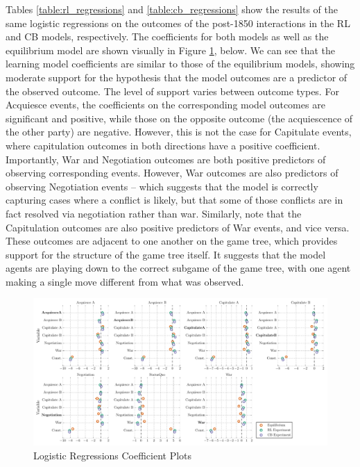 

Tables \ref{table:rl_regressions} and \ref{table:cb_regressions} show the results of the same logistic regressions on the outcomes of the post-1850 interactions in the RL and CB models, respectively. The coefficients for both models as well as the equilibrium model are shown visually in Figure \ref{fig:coef_plots}, below. We can see that the learning model coefficients are similar to those of the equilibrium models, showing moderate support for the hypothesis that the model outcomes are a predictor of the observed outcome. The level of support varies between outcome types. For Acquiesce events, the coefficients on the corresponding model outcomes are significant and positive, while those on the opposite outcome (the acquiescence of the other party) are negative. However, this is not the case for Capitulate events, where capitulation outcomes in both directions have a positive coefficient. Importantly, War and Negotiation outcomes are both positive predictors of observing corresponding events. However, War outcomes are also predictors of observing Negotiation events -- which suggests that the model is correctly capturing cases where a conflict is likely, but that some of those conflicts are in fact resolved via negotiation rather than war. Similarly, note that the Capitulation outcomes are also positive predictors of War events, and vice versa. These outcomes are adjacent to one another on the game tree, which provides support for the structure of the game tree itself. It suggests that the model agents are playing down to the correct subgame of the game tree, with one agent making a single move different from what was observed.

\begin{figure}[h!]
	\includegraphics[width=\textwidth]{WarReason/Figures/WarReason_Coeffs.pdf}
    \caption{Logistic Regressions Coefficient Plots}
    \label{fig:coef_plots}
    \figSpace
\end{figure}

